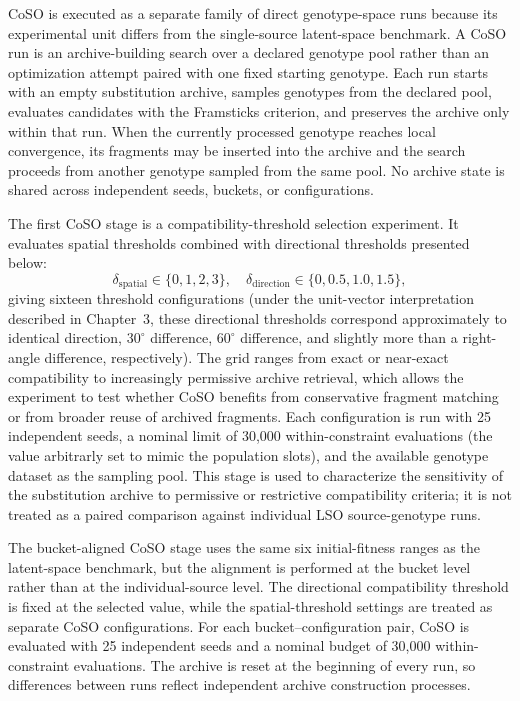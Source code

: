 CoSO is executed as a separate family of direct genotype-space runs because its experimental unit differs from the single-source latent-space benchmark. A CoSO run is an archive-building search over a declared genotype pool rather than an optimization attempt paired with one fixed starting genotype. Each run starts with an empty substitution archive, samples \fone{} genotypes from the declared pool, evaluates candidates with the Framsticks \vertpos{} criterion, and preserves the archive only within that run. When the currently processed genotype reaches local convergence, its fragments may be inserted into the archive and the search proceeds from another genotype sampled from the same pool. No archive state is shared across independent seeds, buckets, or configurations.

The first CoSO stage is a compatibility-threshold selection experiment. It evaluates spatial thresholds 
combined with directional thresholds
presented below:
\[
\delta_{\mathrm{spatial}} \in \{0,1,2,3\}, \quad
\delta_{\mathrm{direction}} \in \{0,0.5,1.0,1.5\},
\] 
giving sixteen threshold configurations (under the unit-vector interpretation described in Chapter~3, these directional thresholds correspond approximately to identical direction, \(30^\circ\) difference, \(60^\circ\) difference, and slightly more than a right-angle difference, respectively). The grid ranges from exact or near-exact compatibility to increasingly permissive archive retrieval, which allows the experiment to test whether CoSO benefits from conservative fragment matching or from broader reuse of archived fragments.
Each configuration is run with 25 independent seeds, a nominal limit of 30,000 within-constraint evaluations (the value arbitrarly set to mimic the population slots), and the available \fone{} genotype dataset as the sampling pool. This stage is used to characterize the sensitivity of the substitution archive to permissive or restrictive compatibility criteria; it is not treated as a paired comparison against individual LSO source-genotype runs.

The bucket-aligned CoSO stage uses the same six initial-fitness ranges as the latent-space benchmark, but the alignment is performed at the bucket level rather than at the individual-source level. 
The directional compatibility threshold is fixed at the selected value, while the spatial-threshold settings are treated as separate CoSO configurations. 
For each bucket--configuration pair, CoSO is evaluated with 25 independent seeds and a nominal budget of 30,000 within-constraint evaluations. The archive is reset at the beginning of every run, so differences between runs reflect independent archive construction processes.

